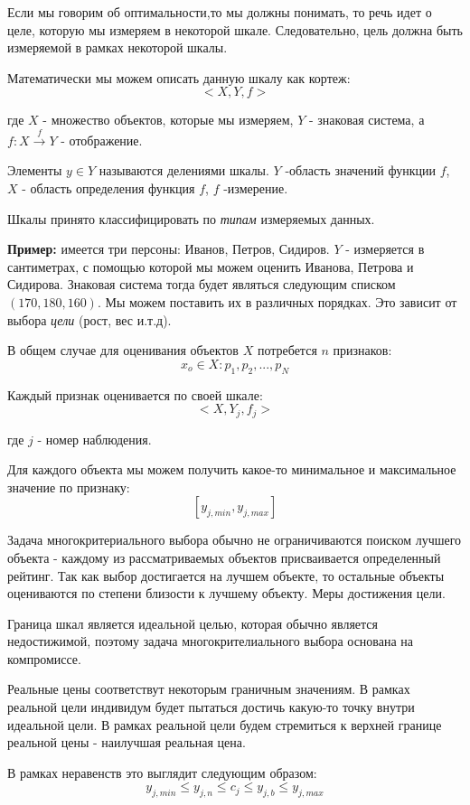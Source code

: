 \documentclass[aps,%
12pt,%
final,%
oneside,
onecolumn,%
musixtex, %
superscriptaddress,%
centertags]{article} %
\begin{document}
Если мы говорим об оптимальности,то мы должны понимать, то речь идет о целе, которую мы измеряем в некоторой шкале.
Следовательно, цель должна быть измеряемой в рамках некоторой шкалы.

Математически мы можем описать данную шкалу как кортеж: 
$$<X,Y,f>$$

где $X$ - множество объектов, которые мы измеряем, $Y$ - знаковая система, а $f: X \stackrel{f}{\to} Y$ - отображение.

Элементы $y \in Y$ называются делениями шкалы. $Y$  -область значений функции $f$, $X$ - область определения функция $f$, $f$ -измерение.

Шкалы принято классифицировать по \textit{типам} измеряемых данных.

\textbf{Пример:} имеется три персоны: Иванов, Петров, Сидиров. $Y$ - измеряется в сантиметрах, с помощью которой мы можем оценить Иванова, Петрова и Сидирова. Знаковая система тогда будет являться следующим списком $(170,180,160)$. Мы можем поставить их в различных порядках. Это зависит от выбора \textit{цели} (рост, вес и.т.д).

В общем случае для оценивания объектов $X$ потребется $n$ признаков:
$$ x_o \in X: p_1,p_2,...,p_N$$

Каждый признак оценивается по своей шкале:
$$ <X, Y_j,f_j >  $$

где $j$ - номер наблюдения.

Для каждого объекта мы можем получить какое-то минимальное и максимальное значение по признаку:
$$\left[ y_{j,min},y_{j,max}\right ] $$

Задача многокритериального выбора обычно не ограничиваются поиском лучшего объекта - каждому из рассматриваемых объектов присваивается определенный рейтинг. Так как выбор достигается на лучшем объекте, то остальные объекты оцениваются по степени близости к лучшему объекту.
Меры достижения цели. 

Граница шкал является идеальной целью, которая обычно является недостижимой, поэтому задача многокрителиального выбора основана на компромиссе.

Реальные цены соответствут некоторым граничным значениям. В рамках реальной цели индивидум будет пытаться достичь какую-то точку внутри идеальной цели. В рамках реальной цели будем стремиться к верхней границе реальной цены - наилучшая реальная цена.

В рамках неравенств это выглядит следующим образом:
$$ y_{j,min} \leq y_{j,n} \leq c_j \leq y_{j,b} \leq y_{j,max}$$
\end{document}
